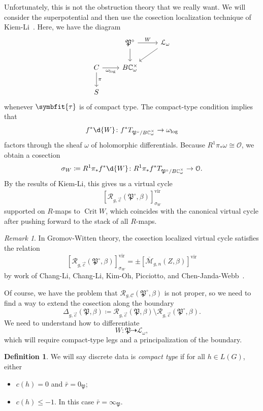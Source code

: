 \documentclass[10pt,oldfontcommands,oneside]{memoir}
\theoremstyle{definition}
\newtheorem{defn}[thm]{Definition}
\theoremstyle{remark}
\newtheorem{rmk}[thm]{Remark}
\theoremstyle{plain}
\theoremstyle{definition}
\theoremstyle{remark}
\newcommand{\C}{\mathbb{C}}
\newcommand{\Mbar}{\overline{\mathcal{M}}}
\newcommand{\mc}[1]{\mathcal{#1}}
\newcommand{\mf}[1]{\mathfrak{#1}}
\newcommand{\btau}{\symbfit{\tau}}
\newcommand{\mr}[1]{\mathrm{#1}}
\newcommand{\1}{\mathbf{1}}
\newcommand{\2}{\mathbf{2}}
\newcommand{\3}{\mathbf{3}}
\newcommand{\vir}{\mr{vir}}
\DeclareMathOperator{\Crit}{Crit}
\begin{document}
Unfortunately, this is not the obstruction theory that we really want. We will consider the superpotential and then use the cosection localization technique of Kiem-Li~\cite{cosection}. Here, we have the diagram
\begin{equation*}
\begin{tikzcd}
    & \mf{P}^{\circ} \ar{r}{W} \ar{d} & \mc{L}_{\omega} \ar{dl} \\
    C \ar[swap]{r}{\omega_{\log}} \ar{d}{\pi} & B \C_{\omega}^{\times} \\
    S
\end{tikzcd}
\end{equation*}
whenever $\btau$ is of compact type. The compact-type condition implies that
\[ f^* \d{W} \colon f^* T_{\mf{P}^{\circ}/B\C_{\omega}^{\times}} \to \omega_{\log} \]
factors through the sheaf $\omega$ of holomorphic differentials. Because $R^1 \pi_* \omega \cong \mc{O}$, we obtain a cosection
\[ \sigma_W \coloneqq R^1 \pi_* f^* \d{W} \colon R^1 \pi_* f^* T_{\mf{P}^{\circ}/B \C_{\omega}^{\times}} \to \mc{O}. \]
By the results of Kiem-Li, this gives us a virtual cycle
\[ [\mc{R}_{g, \vec{c}}(\mf{P}^{\circ}, \beta)]^{\vir}_{\sigma_W} \]
supported on $R$-maps to $\Crit W$,
which coincides with the canonical virtual cycle after pushing forward to the stack of all $R$-maps.

\begin{rmk}
    In Gromov-Witten theory, the cosection localized virtual cycle satisfies the relation
    \[ [ \mc{R}_{g, \vec{c}}(\mf{P}^{\circ},\beta) ]^{\vir}_{\sigma_W} = \pm [\Mbar_{g,n}(Z,\beta)]^{\vir} \]
    by work of Chang-Li, Chang-Li, Kim-Oh, Picciotto, and Chen-Janda-Webb~\cite{pfieldschangli,clqmap,localizedchern,rpthesis,cjw}.
\end{rmk}

Of course, we have the problem that $\mc{R}_{g, \mc{C}}(\mf{P}^{\circ}, \beta)$ is not proper, so we need to find a way to extend the cosection along the boundary
\[ \Delta_{g, \vec{c}} (\mf{P}, \beta) \coloneqq \mc{R}_{g, \vec{c}}(\mf{P}, \beta) \setminus \mc{R}_{g,\vec{c}}(\mf{P}^{\circ}, \beta). \]
We need to understand how to differentiate
\[ W \colon \mf{P} \dashrightarrow \mc{L}_{\omega}, \]
which will require compact-type legs and a principalization of the boundary.

\begin{defn}
    We will say discrete data is \textit{compact type} if for all $h \in L(G)$, either
    \begin{itemize}
        \item $c(h) = 0$ and $\bar{r} = 0_{\mf{P}}$;
        \item $c(h) \leq -1$. In this case $\bar{r} = \infty_{\mf{P}}$.
    \end{itemize}
\end{defn}
\end{document}
